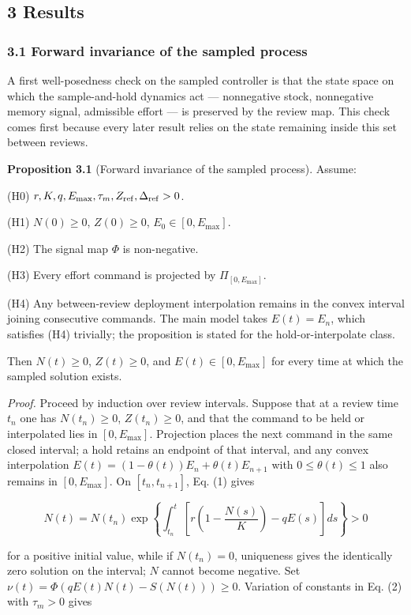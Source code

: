 \documentclass[11pt]{article}
\begin{document}
\subsection{3 Results}\label{results}

\subsubsection{3.1 Forward invariance of the sampled
process}\label{forward-invariance-of-the-sampled-process}

A first well-posedness check on the sampled controller is that the state
space on which the sample-and-hold dynamics act --- nonnegative stock,
nonnegative memory signal, admissible effort --- is preserved by the
review map. This check comes first because every
later result relies on the state remaining inside this set between
reviews.

\textbf{Proposition 3.1} (Forward invariance of the sampled process).
Assume:

(H0) \(r,K,q,E_{\max},\tau_m,Z_{\rm ref},\Delta_{\rm ref}>0\).

(H1) \(N(0)\ge 0\), \(Z(0)\ge 0\), \(E_0\in[0,E_{\max}]\).

(H2) The signal map \(\Phi\) is non-negative.

(H3) Every effort command is projected by \(\Pi_{[0,E_{\max}]}\).

(H4) Any between-review deployment interpolation remains in the convex
interval joining consecutive commands. The main model takes \(E(t)=E_n\), which satisfies (H4) trivially; the proposition is stated for the hold-or-interpolate class.

Then \(N(t)\ge 0\), \(Z(t)\ge 0\), and \(E(t)\in[0,E_{\max}]\) for every
time at which the sampled solution exists.

\emph{Proof.} Proceed by induction over review intervals. Suppose that
at a review time \(t_n\) one has \(N(t_n)\ge 0\), \(Z(t_n)\ge 0\), and
that the command to be held or interpolated lies in \([0,E_{\max}]\).
Projection places the next command in the same closed interval; a hold
retains an endpoint of that interval, and any convex interpolation
\(E(t)=(1-\theta(t))E_n+\theta(t)E_{n+1}\) with \(0\le\theta(t)\le 1\)
also remains in \([0,E_{\max}]\). On \([t_n,t_{n+1}]\), Eq. (1) gives

\[
N(t)=N(t_n)\exp\left\{\int_{t_n}^{t}\left[r\left(1-\frac{N(s)}{K}\right)-qE(s)\right]ds\right\}>0
\]

for a positive initial value, while if \(N(t_n)=0\), uniqueness gives
the identically zero solution on the interval; \(N\) cannot become
negative. Set \(\nu(t)=\Phi(qE(t)N(t)-S(N(t)))\ge 0\). Variation of
constants in Eq. (2) with \(\tau_m>0\) gives
\end{document}
